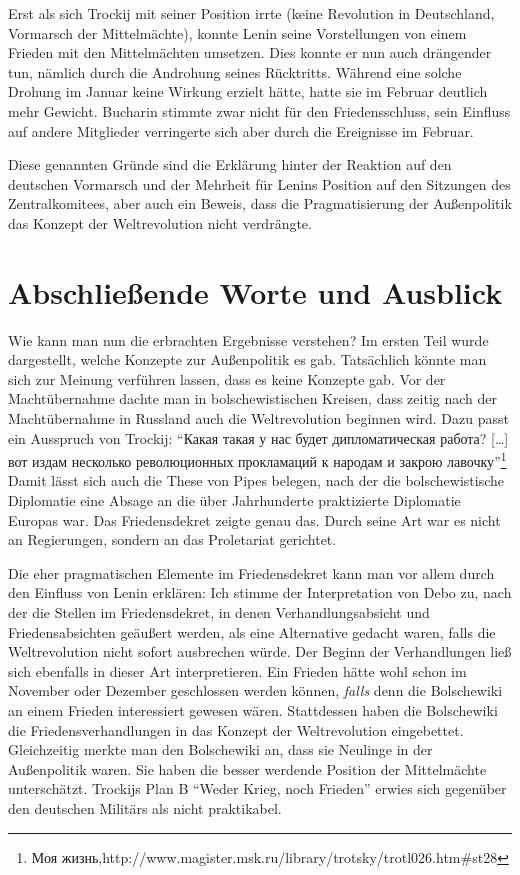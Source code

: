 \documentclass[12pt,headsepline,a4paper]{scrartcl}
\newcommand\textcyr[1]{{\fontencoding{OT2}\fontfamily{wncyr}\selectfont #1}}
\begin{document}
Erst als sich Trockij mit seiner Position irrte (keine Revolution in Deutschland, Vormarsch der Mittelmächte), konnte Lenin seine Vorstellungen von einem Frieden mit den Mittelmächten umsetzen. Dies konnte er nun auch drängender tun, nämlich durch die Androhung seines Rücktritts. Während eine solche Drohung im Januar keine Wirkung erzielt hätte, hatte sie im Februar deutlich mehr Gewicht. Bucharin stimmte zwar nicht für den Friedensschluss, sein Einfluss auf andere Mitglieder verringerte sich aber durch die Ereignisse im Februar. 

Diese genannten Gründe sind die Erklärung hinter der Reaktion auf den deutschen Vormarsch und der Mehrheit für Lenins Position auf den Sitzungen des Zentralkomitees, aber auch ein Beweis, dass die Pragmatisierung der Außenpolitik das Konzept der Weltrevolution nicht verdrängte.

\newpage
\section*{Abschließende Worte und Ausblick}
Wie kann man nun die erbrachten Ergebnisse verstehen? Im ersten Teil wurde dargestellt, welche Konzepte zur Außenpolitik es gab. Tatsächlich könnte man sich zur Meinung verführen lassen, dass es keine Konzepte gab. Vor der Machtübernahme dachte man in bolschewistischen Kreisen, dass zeitig nach der Machtübernahme in Russland auch die Weltrevolution beginnen wird. Dazu passt ein Ausspruch von Trockij: "`\textcyr{Какая такая у нас будет дипломатическая работа? [\ldots] вот издам несколько революционных прокламаций к народам и закрою лавочку}"'\footnote{\textcyr{Моя жизнь,}http://www.magister.msk.ru/library/trotsky/trotl026.htm\#st28}
Damit lässt sich auch die These\autocite[389]{pipes1992} von Pipes belegen, nach der die bolschewistische Diplomatie eine Absage an die über Jahrhunderte praktizierte Diplomatie Europas war. Das Friedensdekret zeigte genau das. Durch seine Art war es nicht an Regierungen, sondern an das Proletariat gerichtet.

Die eher pragmatischen Elemente im Friedensdekret kann man vor allem durch den Einfluss von Lenin erklären:
Ich stimme der Interpretation\autocite[18]{debo1979} von Debo zu, nach der die Stellen im Friedensdekret, in denen Verhandlungsabsicht und Friedensabsichten geäußert werden, als eine Alternative gedacht waren, falls die Weltrevolution nicht sofort ausbrechen würde.
Der Beginn der Verhandlungen ließ sich ebenfalls in dieser Art interpretieren. Ein Frieden hätte wohl schon im November oder Dezember geschlossen werden können, \textit{falls} denn die Bolschewiki an einem Frieden interessiert gewesen wären. Stattdessen haben die Bolschewiki die Friedensverhandlungen in das Konzept der Weltrevolution eingebettet. Gleichzeitig merkte man den Bolschewiki an, dass sie Neulinge in der Außenpolitik waren. Sie haben die besser werdende Position der Mittelmächte unterschätzt. Trockijs Plan B "`Weder Krieg, noch Frieden"' erwies sich gegenüber den deutschen Militärs als nicht praktikabel.
\end{document}
